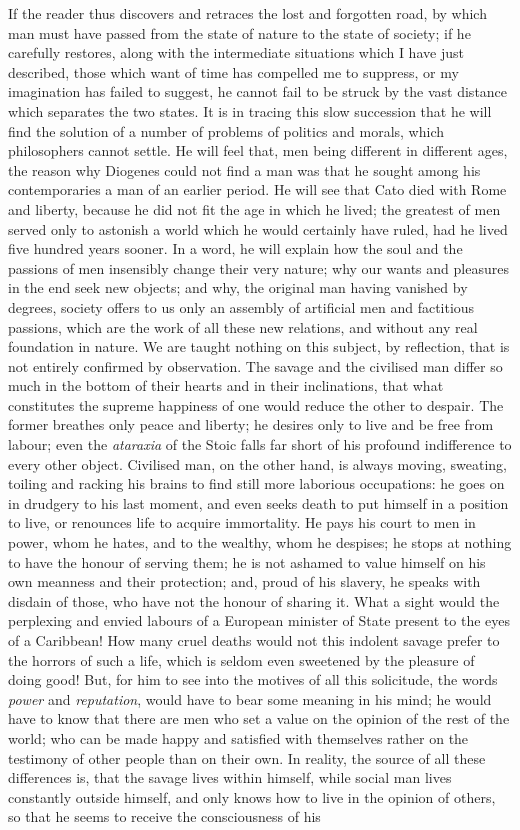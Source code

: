 \documentclass[12pt]{report}
\begin{document}
If the reader thus discovers and retraces the lost and forgotten road, by which man must have passed from the state of nature to the state of society; if he carefully restores, along with the intermediate situations which I have just described, those which want of time has compelled me to suppress, or my imagination has failed to suggest, he cannot fail to be struck by the vast distance which separates the two states. It is in tracing this slow succession that he will find the solution of a number of problems of politics and morals, which philosophers cannot settle. He will feel that, men being different in different ages, the reason why Diogenes could not find a man was that he sought among his contemporaries a man of an earlier period. He will see that Cato died with Rome and liberty, because he did not fit the age in which he lived; the greatest of men served only to astonish a world which he would certainly have ruled, had he lived five hundred years sooner. In a word, he will explain how the soul and the passions of men insensibly change their very nature; why our wants and pleasures in the end seek new objects; and why, the original man having vanished by degrees, society offers to us only an assembly of artificial men and factitious passions, which are the work of all these new relations, and without any real foundation in nature. We are taught nothing on this subject, by reflection, that is not entirely confirmed by observation. The savage and the civilised man differ so much in the bottom of their hearts and in their inclinations, that what constitutes the supreme happiness of one would reduce the other to despair. The former breathes only peace and liberty; he desires only to live and be free from labour; even the \textit{ataraxia} of the Stoic falls far short of his profound indifference to every other object. Civilised man, on the other hand, is always moving, sweating, toiling and racking his brains to find still more laborious occupations: he goes on in drudgery to his last moment, and even seeks death to put himself in a position to live, or renounces life to acquire immortality. He pays his court to men in power, whom he hates, and to the wealthy, whom he despises; he stops at nothing to have the honour of serving them; he is not ashamed to value himself on his own meanness and their protection; and, proud of his slavery, he speaks with disdain of those, who have not the honour of sharing it. What a sight would the perplexing and envied labours of a European minister of State present to the eyes of a Caribbean! How many cruel deaths would not this indolent savage prefer to the horrors of such a life, which is seldom even sweetened by the pleasure of doing good! But, for him to see into the motives of all this solicitude, the words \emph{power} and \emph{reputation}, would have to bear some meaning in his mind; he would have to know that there are men who set a value on the opinion of the rest of the world; who can be made happy and satisfied with themselves rather on the testimony of other people than on their own. In reality, the source of all these differences is, that the savage lives within himself, while social man lives constantly outside himself, and only knows how to live in the opinion of others, so that he seems to receive the consciousness of his 
\end{document}
